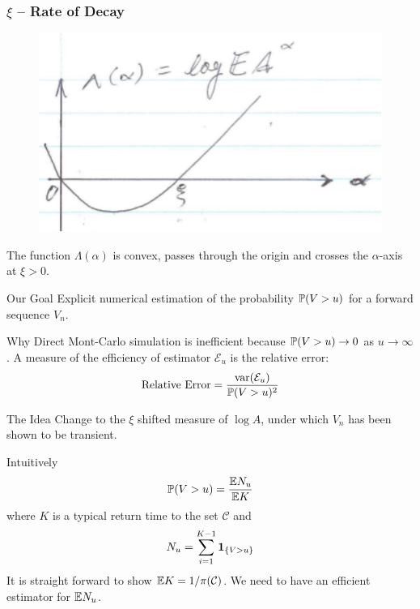 \documentclass{beamer}
\begin{document}
\begin{frame}
  \frametitle{$\xi$ -- Rate of Decay}
  \begin{figure}[htb!]
    \centering
    \includegraphics[scale=0.8]{pic2.pdf}
  \end{figure}
  The function $\Lambda(\alpha)$ is convex, passes through the origin
  and crosses the $\alpha$-axis at $\xi > 0$.
\end{frame}

\begin{frame}
  \begin{exampleblock}{Our Goal}
    Explicit numerical estimation of the probability $\P(V > u)$ for a
    forward sequence $V_n$.
  \end{exampleblock}
  \begin{exampleblock}{Why}
    Direct Mont-Carlo simulation is inefficient because
    $\P(V > u) \to 0$ as $u \to \infty$. A measure of the efficiency
    of estimator $\mathcal E_u$ is the relative error:
    \[
    \text{Relative Error} = {
      \var(\mathcal E_u)
      \over
      \P(V > u)^2
    }
    \]
  \end{exampleblock}
  \begin{exampleblock}{The Idea}
    Change to the $\xi$ shifted measure of $\log A$, under which $V_n$ has
    been shown to be transient.
  \end{exampleblock}
\end{frame}

\begin{frame}
  Intuitively
  \[
  \P(V > u) = {
    \E N_u
    \over
    \E K
  }
  \]
  where $K$ is a typical return time to the set $\mathcal C$ and
  \[
  N_u = \sum_{i=1}^{K - 1} \1{V > u}
  \]
  It is straight forward to show $\E K = 1/\pi(\mathcal C)$. We need to
  have an efficient estimator for $\E N_u$.
\end{frame}
\end{document}

